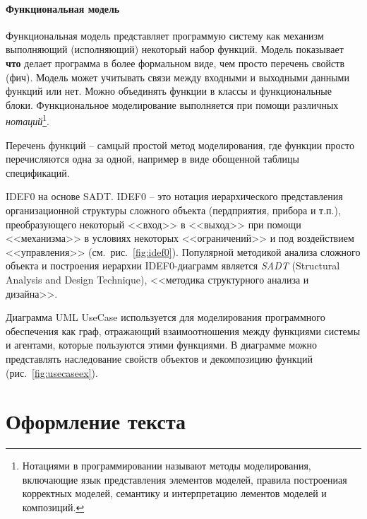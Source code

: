 \documentclass[a4paper,14pt,final]{extreport}
\begin{document}
\subsubsection{Функциональная модель}
\label{sec:funmod}

Функциональная модель представляет программую систему как механизм выполняющий (исполняющий) некоторый набор функций.  Модель показывает \textbf{что} делает программа в более формальном виде, чем просто перечень свойств (фич).   Модель может учитывать связи между входными и выходными данными функций или нет.  Можно объединять функции в классы и функциональные блоки.  Функциональное моделирование выполняется при помощи различных \emph{нотаций}\footnote{Нотациями в программировании называют методы моделирования, включающие язык представления элементов моделей, правила построениая корректных моделей, семантику и интерпретацию лементов моделей и композиций.}.  

\begin{description}
\item{Перечень функций} -- самцый простой метод моделирования, где функции просто перечисляются одна за одной, например в виде обощенной таблицы спецификаций.
\item{IDEF0 на основе SADT.}  IDEF0 -- это нотация иерархического представления организационной структуры сложного объекта (пердприятия, прибора и т.п.), преобразующего некоторый <<вход>> в <<выход>> при помощи <<механизма>> в условиях некоторых <<ограничений>> и под воздействием <<управления>> (см.~рис.~\ref{fig:idef0}).  Популярной методикой анализа сложного объекта и построения иерархии IDEF0-диаграмм является \emph{SADT} (Structural Analysis and Design Technique), <<методика структурного анализа и дизайна>>.     
\item{Диаграмма UML UseCase} используется для моделирования программного обеспечения как граф, отражающий взаимоотношения между функциями системы и агентами, которые пользуются этими функциями.  В диаграмме можно представлять наследование свойств объектов и декомпозицию функций (рис.~\ref{fig:usecaseex}).
\end{description}

\chapter{Оформление текста}
\label{cha:layout}
\end{document}

